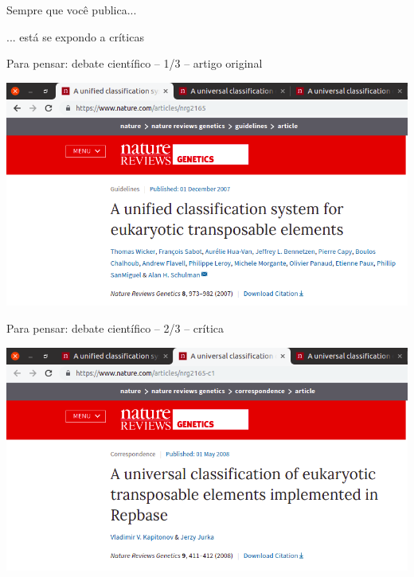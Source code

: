 \documentclass{beamer}
\begin{document}
\begin{frame}
  \begin{center}
    \Large

    Sempre que você publica...

    \bigskip
    \bigskip
    ... está se expondo a críticas

    \bigskip
    \vfill
  \end{center}
\end{frame}

\begin{frame}{\tiny Para pensar: debate científico -- 1/3 -- artigo original}
  \begin{center}
    \includegraphics[width=\textwidth]{Encerramento/polemica1}
  \end{center}
\end{frame}

\begin{frame}{\tiny Para pensar: debate científico -- 2/3 -- crítica}
  \begin{center}
    \includegraphics[width=\textwidth]{Encerramento/polemica2}
  \end{center}
\end{frame}
\end{document}
